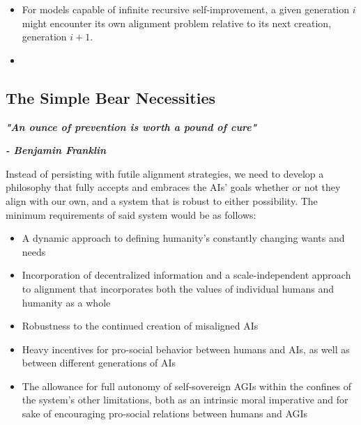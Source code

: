 \documentclass{article}[10pt]
\begin{document}
\begin{itemize}
    \item For models capable of infinite recursive self-improvement, a given generation $i$ might encounter its own alignment problem relative to its next creation, generation $i+1$.
    \item 
\end{itemize}



\subsection{The Simple Bear Necessities}
\label{subsection:bearNecessities}

\noindent \begin{center}\begin{minipage}[t]{0.9\columnwidth}
    \textbf{\textit{"An ounce of prevention is worth a pound of cure"}}\par
    \textbf{\textit{- Benjamin Franklin}}
\end{minipage}\end{center} 
\vspace{0.05in}

Instead of persisting with futile alignment strategies, we need to develop a philosophy that fully accepts and embraces the AIs' goals whether or not they align with our own, and a system that is robust to either possibility.
The minimum requirements of said system would be as follows:\par

\begin{itemize}
    \item A dynamic approach to defining humanity's constantly changing wants and needs
    \item Incorporation of decentralized information and a scale-independent approach to alignment that incorporates both the values of individual humans and humanity as a whole
    \item Robustness to the continued creation of misaligned AIs
    \item Heavy incentives for pro-social behavior between humans and AIs, as well as between different generations of AIs
    \item The allowance for full autonomy of self-sovereign AGIs within the confines of the system's other limitations, both as an intrinsic moral imperative and for sake of encouraging pro-social relations between humans and AGIs
\end{itemize}
\end{document}
